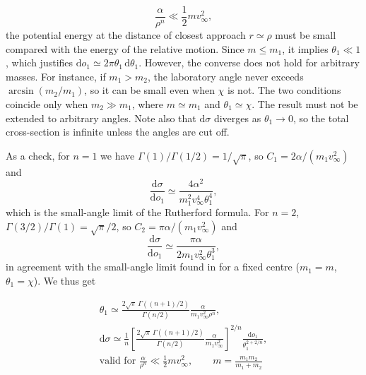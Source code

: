 \begin{problem}[title={Small-angle cross-section in a field \texorplain{$\alpha/r^n$}{α/rⁿ}}]
{\begin{equation*}
    \frac{\alpha}{\rho^n} \ll \frac{1}{2}mv_\infty^2,
\end{equation*}
\ie the potential energy at the distance of closest approach $r \simeq \rho$ must be small compared with the energy of the relative motion. Since $m \leq m_1$, it implies $\theta_1 \ll 1$, which justifies $\mathrm{d}o_1 \simeq 2\pi\theta_1\,\mathrm{d}\theta_1$. However, the converse does not hold for arbitrary masses. For instance, if $m_1 > m_2$, the laboratory angle never exceeds $\arcsin(m_2/m_1)$, so it can be small even when $\chi$ is not. The two conditions coincide only when $m_2 \gg m_1$, where $m \simeq m_1$ and $\theta_1 \simeq \chi$. The result must not be extended to arbitrary angles. Note also that $\mathrm{d}\sigma$ diverges as $\theta_1 \to 0$, so the total cross-section is infinite unless the angles are cut off.

As a check, for $n = 1$ we have $\Gamma(1)/\Gamma(1/2) = 1/\sqrt{\pi}$, so $C_1 = 2\alpha/(m_1v_\infty^2)$ and
\begin{equation*}
    \frac{\mathrm{d}\sigma}{\mathrm{d}o_1} \simeq \frac{4\alpha^2}{m_1^2v_\infty^4\theta_1^4},
\end{equation*}
which is the small-angle limit of the Rutherford formula. For $n = 2$, $\Gamma(3/2)/\Gamma(1) = \sqrt{\pi}/2$, so $C_2 = \pi\alpha/(m_1v_\infty^2)$ and
\begin{equation*}
    \frac{\mathrm{d}\sigma}{\mathrm{d}o_1} \simeq \frac{\pi\alpha}{2m_1v_\infty^2\theta_1^3},
\end{equation*}
in agreement with the small-angle limit found in  for a fixed centre ($m_1 = m$, $\theta_1 = \chi$). We thus get
}
{
\begin{gather*}
    \theta_1 \simeq \frac{2\sqrt{\pi}\,\Gamma\left( (n+1)/2 \right)}{\Gamma(n/2)}\frac{\alpha}{m_1v_\infty^2\rho^n}, \\
    \mathrm{d}\sigma \simeq \frac{1}{n}\left[ \frac{2\sqrt{\pi}\,\Gamma\left( (n+1)/2 \right)}{\Gamma(n/2)}\frac{\alpha}{m_1v_\infty^2} \right]^{2/n}\frac{\mathrm{d}o_1}{\theta_1^{2+2/n}}, \\
    \text{valid for } \frac{\alpha}{\rho^n} \ll \frac{1}{2}mv_\infty^2, \qquad m = \frac{m_1m_2}{m_1 + m_2}
\end{gather*}
}
\end{problem}

